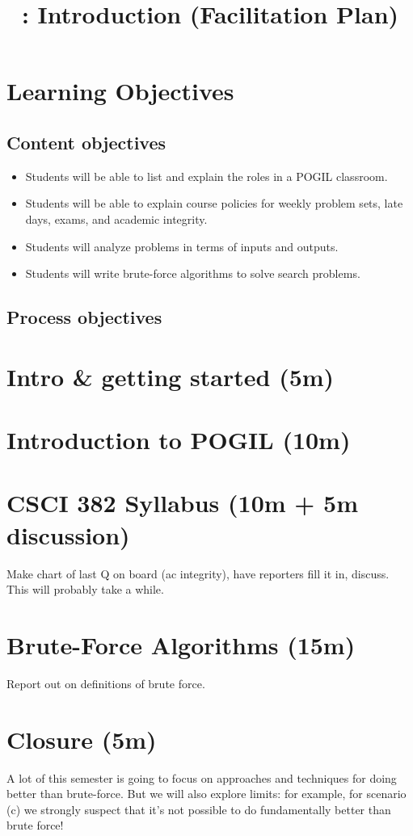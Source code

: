 \documentclass{tufte-handout}
\title{\thecourse: Introduction (Facilitation Plan)}
\date{}
\begin{document}
\maketitle

\section{Learning Objectives}

\subsection{Content objectives}

\begin{itemize}
\item Students will be able to list and explain the roles in a POGIL
  classroom.
\item Students will be able to explain course policies for weekly problem
  sets, late days, exams, and academic integrity.
\item Students will analyze problems in terms of inputs and outputs.
\item Students will write brute-force algorithms to solve search
  problems.
\end{itemize}

\subsection{Process objectives}

\section{Intro \& getting started (5m)}

\section{Introduction to POGIL (10m)}

\section{CSCI 382 Syllabus (10m + 5m discussion)}

Make chart of last Q on board (ac integrity), have reporters fill it
in, discuss.  This will probably take a while.

\section{Brute-Force Algorithms (15m)}

Report out on definitions of brute force.

\section{Closure (5m)}

A lot of this semester is going to focus on approaches and techniques
for doing better than brute-force.  But we will also explore limits:
for example, for scenario (c) we strongly suspect that it's not
possible to do fundamentally better than brute force!
\end{document}
